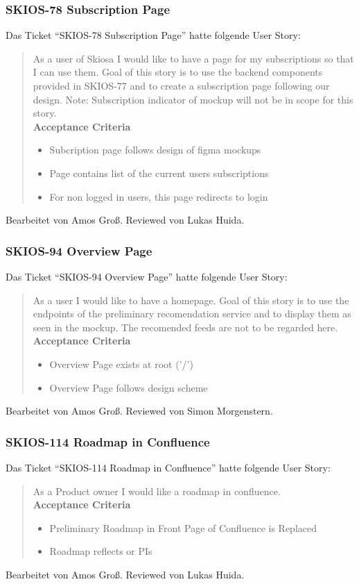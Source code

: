 \subsubsection{SKIOS-78 Subscription Page}
Das Ticket \enquote{SKIOS-78 Subscription Page} hatte folgende User Story:
\begin{quotation}
    As a user of Skiosa I would like to have a page for my subscriptions so that I can use them.
    Goal of this story is to use the backend components provided in SKIOS-77 and to create a subscription page following our design.
    Note: Subscription indicator of mockup will not be in scope for this story. \\
\textbf{Acceptance Criteria}
\begin{itemize}
    \item Subcription page follows design of figma mockups
    \item Page contains list of the current users subscriptions
    \item For non logged in users, this page redirects to login
\end{itemize}
\end{quotation}
Bearbeitet von Amos Groß.
Reviewed von Lukas Huida.

\subsubsection{SKIOS-94 Overview Page}
Das Ticket \enquote{SKIOS-94 Overview Page} hatte folgende User Story:
\begin{quotation}
    As a user I would like to have a homepage.
    Goal of this story is to use the endpoints of the preliminary recomendation service and to display them as seen in the mockup.
    The recomended feeds are not to be regarded here. \\
\textbf{Acceptance Criteria}
\begin{itemize}
    \item Overview Page exists at root ('/')
    \item Overview Page follows design scheme 
\end{itemize}
\end{quotation}
Bearbeitet von Amos Groß.
Reviewed von Simon Morgenstern.

\subsubsection{SKIOS-114 Roadmap in Confluence}
Das Ticket \enquote{SKIOS-114 Roadmap in Confluence} hatte folgende User Story:
\begin{quotation}
    As a Product owner I would like a roadmap in confluence. \\
\textbf{Acceptance Criteria}
\begin{itemize}
    \item Preliminary Roadmap in Front Page of Confluence is Replaced
    \item Roadmap reflects or PIs
\end{itemize}
\end{quotation}
Bearbeitet von Amos Groß.
Reviewed von Lukas Huida.

